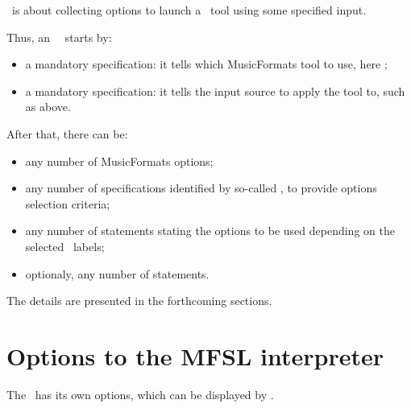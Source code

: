 \mfslLang\ is about collecting options to launch a \mf\ tool using some specified input.

Thus, an \mfslLang\ \script\ starts by:
\begin{itemize}
\item a mandatory  specification: it tells which MusicFormats tool
    to use, here \xmlToLy;

\item  a mandatory   specification: it tells the input source to apply
    the tool to, such as  above.
\end{itemize}

After that, there can be:
\begin{itemize}
\item  any number of MusicFormats options;

\item  any number of   specifications identified by so-called , to provide options selection criteria;

\item any number of   statements stating the options to be used depending on
  the selected \choice\ labels;

\item optionaly, any number of  statements.

\end{itemize}

The details are presented in the forthcoming sections.


\section{Options to the MFSL interpreter}

The \mfslInterp\ has its own options, which can be displayed by .

